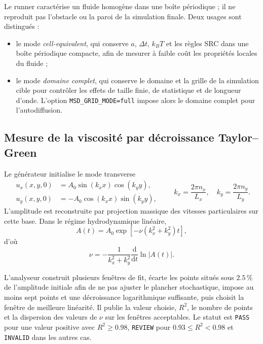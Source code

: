 \documentclass[11pt,a4paper]{article}
\begin{document}
Le runner caractérise un fluide homogène dans une boîte périodique ; il ne reproduit pas l'obstacle ou la paroi de la simulation finale. Deux usages sont distingués :
\begin{itemize}[leftmargin=*]
  \item le mode \emph{cell-equivalent}, qui conserve $a$, $\Delta t$, $k_BT$ et les règles SRC dans une boîte périodique compacte, afin de mesurer à faible coût les propriétés locales du fluide ;
  \item le mode \emph{domaine complet}, qui conserve le domaine et la grille de la simulation cible pour contrôler les effets de taille finie, de statistique et de longueur d'onde. L'option \texttt{MSD\_GRID\_MODE=full} impose alors le domaine complet pour l'autodiffusion.
\end{itemize}

\subsection{Mesure de la viscosité par décroissance Taylor--Green}

Le générateur initialise le mode transverse
\begin{equation}
\begin{aligned}
  u_x(x,y,0)&=A_0\sin(k_xx)\cos(k_yy),\\
  u_y(x,y,0)&=-A_0\cos(k_xx)\sin(k_yy),
\end{aligned}
\qquad
k_x=\frac{2\pi n_x}{L_x},\quad
k_y=\frac{2\pi n_y}{L_y}.
\end{equation}
L'amplitude est reconstruite par projection massique des vitesses particulaires sur cette base. Dans le régime hydrodynamique linéaire,
\begin{equation}
  A(t)=A_0\exp\left[-\nu(k_x^2+k_y^2)t\right],
\end{equation}
d'où
\begin{equation}
  \nu=-\frac{1}{k_x^2+k_y^2}\frac{\mathrm d}{\mathrm dt}\ln|A(t)|.
\end{equation}

L'analyseur construit plusieurs fenêtres de fit, écarte les points situés sous $2.5\,\%$ de l'amplitude initiale afin de ne pas ajuster le plancher stochastique, impose au moins sept points et une décroissance logarithmique suffisante, puis choisit la fenêtre de meilleure linéarité. Il publie la valeur choisie, $R^2$, le nombre de points et la dispersion des valeurs de $\nu$ sur les fenêtres acceptables. Le statut est \texttt{PASS} pour une valeur positive avec $R^2\geq0.98$, \texttt{REVIEW} pour $0.93\leq R^2<0.98$ et \texttt{INVALID} dans les autres cas.
\end{document}
